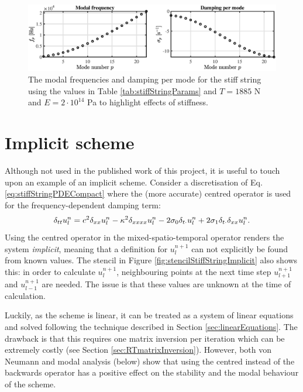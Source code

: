 {\begin{figure}[h]
    \centering
    \includegraphics[width=\textwidth]{figures/resonators/modesStiffString.eps}
    \caption{The modal frequencies and damping per mode for the stiff string using the values in Table \ref{tab:stiffStringParams} and $T = 1885$ N and $E = 2\cdot 10^{14}$ Pa to highlight effects of stiffness. %
    \label{fig:modesStiffString}}
\end{figure}

\section{Implicit scheme}\label{sec:implicitStiffString}
Although not used in the published work of this project, it is useful to touch upon an example of an implicit scheme. Consider a discretisation of Eq. \eqref{eq:stiffStringPDECompact} where the (more accurate) centred operator is used for the frequency-dependent damping term:
\begin{equation}\label{eq:stiffStringFDSImplicit}
    \delta_{tt} u_l^n = c^2 \delta_{xx} u_l^n - \kappa^2 \delta_{xxxx} u_l^n - 2 \sigma_{0} \delta_{t\cdot} u_l^n + 2 \sigma_{1}\delta_{t\cdot}\delta_{xx} u_l^n.
\end{equation}
Using the centred operator in the mixed-spatio-temporal operator renders the system \textit{implicit}, meaning that a definition for $u_l^{n+1}$ can not explicitly be found from known values. The stencil in Figure \ref{fig:stencilStiffStringImplicit} also shows this: in order to calculate $u_l^{n+1}$, neighbouring points at the next time step $u_{l+1}^{n+1}$ and $u_{l-1}^{n+1}$ are needed. The issue is that these values are unknown at the time of calculation.

Luckily, as the scheme is linear, it can be treated as a system of linear equations and solved following the technique described in Section \ref{sec:linearEquations}. The drawback is that this requires one matrix inversion per iteration which can be extremely costly (see Section \ref{sec:RTmatrixInversion}). However, both von Neumann and modal analysis (below) show that using the centred instead of the backwards operator has a positive effect on the stability and the modal behaviour of the scheme. 

}
